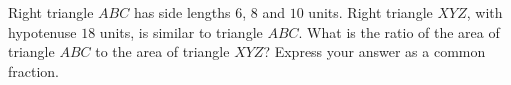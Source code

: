 Right triangle $ABC$ has side lengths $6$, $8$ and $10$ units. Right triangle $XYZ$, with hypotenuse $18$ units, is similar to triangle $ABC$. What is the ratio of the area of triangle $ABC$ to the area of triangle $XYZ$? Express your answer as a common fraction.
